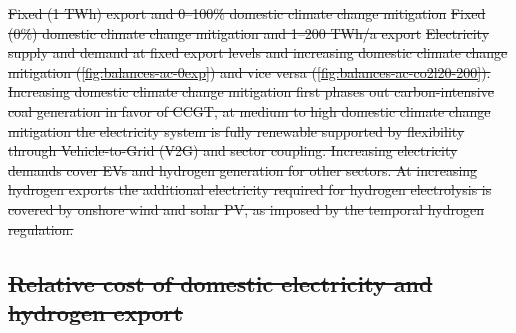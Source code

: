 \documentclass[5p,numafflabel]{elsarticle}
\def\runstandard{decr_13_3H_ws} %
\providecommand{\DIFdeltex}[1]{{\protect\color{red}\sout{#1}}}                      %
\providecommand{\DIFdelFL}[1]{\DIFdel{#1}} %
\providecommand{\DIFdel}[1]{\texorpdfstring{\DIFdeltex{#1}}{}} %
\begin{document}
{%
\DIFdelFL{Fixed (1 TWh) export and 0--100\% domestic climate change mitigation}}
{%
\DIFdelFL{Fixed (0\%) domestic climate change mitigation and 1--200 TWh/a export}}
{%
\DIFdelFL{Electricity supply and demand at fixed export levels and increasing domestic climate change mitigation (\ref{fig:balances-ac-0exp}) and vice versa (\ref{fig:balances-ac-co2l20-200}). Increasing domestic climate change mitigation first phases out carbon-intensive coal generation in favor of CCGT, at medium to high domestic climate change mitigation the electricity system is fully renewable supported by flexibility through Vehicle-to-Grid (V2G) and sector coupling. Increasing electricity demands cover EVs and hydrogen generation for other sectors.
    At increasing hydrogen exports the additional electricity required for hydrogen electrolysis is covered by onshore wind and solar PV, as imposed by the temporal hydrogen regulation. 
    }}

\subsection{\DIFdel{Relative cost of domestic electricity and hydrogen export}}
\addtocounter{subsection}{-1}%
\end{document}
